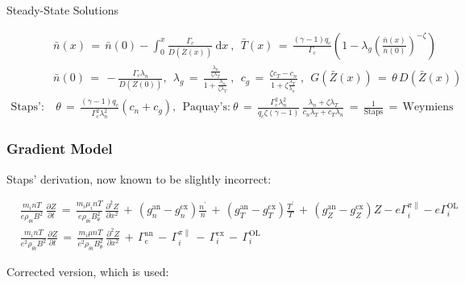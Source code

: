 \documentclass[a4paper,8pt]{article}
\begin{document}
\normalsize

Steady-State Solutions \small

\begin{align}
    &\bar{n}(x) \,=\, \bar{n}(0) - \int_0^x \frac{\Gamma_c}{D(\bar{Z}(x))}~\text{d}x~,
        ~~ \bar{T}(x) \,=\, \frac{(\gamma - 1) q_c}{\Gamma_c} \left(1 - \lambda_g\left(\frac{\bar{n}(x)}{\bar{n}(0)}\right)^{-\zeta}\right) \\
    &\bar{n}(0) \,=\, -\frac{\Gamma_c \lambda_n}{D(\bar{Z}(0))},
        ~~ \lambda_g \,=\, \frac{\frac{\lambda_n}{\zeta \lambda_T}}{1 + \frac{\lambda_n}{\zeta \lambda_T}}~,
        ~~ c_g \,=\, \frac{\zeta c_T - c_n}{1 + \zeta \frac{\lambda_T}{\lambda_n}}~, ~~ G(\bar{Z}(x)) \,=\, \theta\,D(\bar{Z}(x)) \\
    \text{Staps':}& ~ \theta \,=\, \frac{(\gamma - 1) q_c}{\Gamma_c^2 \lambda_n^2} (c_n + c_g), ~~ \text{Paquay's:} ~ \theta \,=\, \frac{\Gamma_c^2 \lambda_n^2}{q_c \zeta (\gamma - 1)} \, \frac{\lambda_n + \zeta\lambda_T}{c_n\lambda_T + c_T\lambda_n} \,=\, \frac{1}{\text{Staps}} \,=\, \text{Weymiens}
\end{align}

\normalsize

\subsubsection{Gradient Model}\label{gradient-model}

Staps' derivation, now known to be slightly incorrect: \small

\begin{align}
    &\frac{m_i n T}{e \rho_{\theta i} B^2} \, \frac{\partial Z}{\partial t}
        \,=\, \frac{m_i \mu_i n T}{e \rho_{\theta i} B_\theta^2} \,
        \frac{\partial^2 Z}{\partial x^2} \,+\, \left(g_n^\text{an} -
        g_n^\text{cx}\right) \frac{n^\prime}{n} \,+\, \left(g_T^\text{an} -
        g_T^\text{cx}\right) \frac{T^\prime}{T} \,+\, \left(g_Z^\text{an} -
        g_Z^\text{cx}\right) Z - e\Gamma_i^{\pi\parallel} - e\Gamma_i^\text{OL} \\
    &\frac{m_i n T}{e^2 \rho_{\theta i} B^2} \frac{\partial Z}{\partial t}
        \,=\, \frac{m_i \mu n T}{e^2 \rho_{\theta i} B_\theta^2} \, 
        \frac{\partial^2 Z}{\partial x^2} \,+\, \Gamma_e^\text{an} \,-\,
        \Gamma_i^{\pi\parallel} \,-\, \Gamma_i^\text{cx} \,-\,
        \Gamma_i^\text{OL}
\end{align}

\normalsize

Corrected version, which is used: \small
\end{document}
